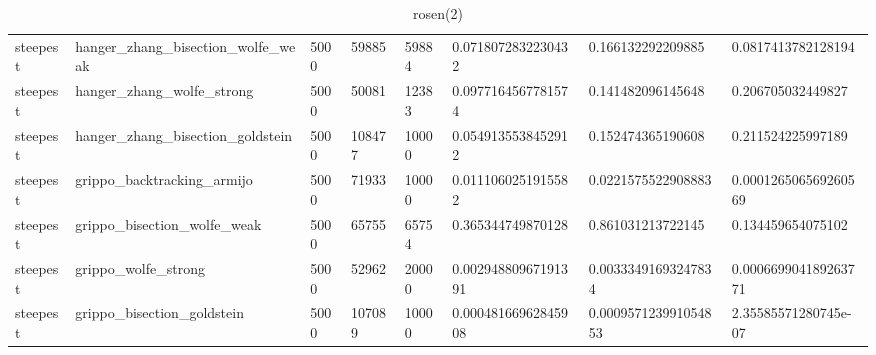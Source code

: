 \documentclass[a4paper,11pt]{article}
\numberwithin{equation}{section} %
\begin{document}
\begin{table}[h!]
{\begin{tabular}{|l|l|l|l|l|l|l|l|}
        steepest & hanger\_zhang\_bisection\_wolfe\_weak & 5000 & 59885 & 59884 & 0.0718072832230432 & 0.166132292209885 & 0.0817413782128194 \\
        steepest & hanger\_zhang\_wolfe\_strong & 5000 & 50081 & 12383 & 0.0977164567781574 & 0.141482096145648 & 0.206705032449827 \\
        steepest & hanger\_zhang\_bisection\_goldstein & 5000 & 108477 & 10000 & 0.0549135538452912 & 0.152474365190608 & 0.211524225997189 \\
        steepest & grippo\_backtracking\_armijo & 5000 & 71933 & 10000 & 0.0111060251915582 & 0.0221575522908883 & 0.000126506569260569 \\
        steepest & grippo\_bisection\_wolfe\_weak & 5000 & 65755 & 65754 & 0.365344749870128 & 0.861031213722145 & 0.134459654075102 \\
        steepest & grippo\_wolfe\_strong & 5000 & 52962 & 20000 & 0.00294880967191391 & 0.00333491693247834 & 0.000669904189263771 \\
        steepest & grippo\_bisection\_goldstein & 5000 & 107089 & 10000 & 0.00048166962845908 & 0.000957123991054853 & 2.35585571280745e-07 \\
\end{tabular}}
\caption{rosen(2)}
\label{table:rosen(2)}
\end{table}
\end{document}
